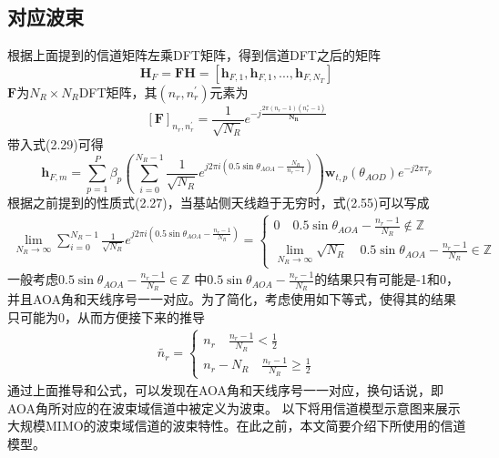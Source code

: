 \documentclass[bachelor,nocolorlinks, printoneside]{seuthesis} %
\begin{document}
\begin{Main}
\subsection{对应波束}
根据上面提到的信道矩阵左乘DFT矩阵，得到信道DFT之后的矩阵
\begin{equation}\label{key}
\mathbf{H}_{F} = \mathbf{F} \mathbf{H} =[\mathbf{h}_{F,1},\mathbf{h}_{F,1},...,\mathbf{h}_{F,N_T}]
\end{equation}
$\mathbf{F}$为$N_R \times N_R $DFT矩阵，其$(n_r,n_r^{'})$元素为
\begin{equation}\label{key}
[ \mathbf{F} ]_{n_r,n_r^{'}} = \frac{1}{\sqrt{N_R}} e^{-j \frac{2\pi (n_r-1)(n_r^{*}-1)}{\mathbf{N_R}}}
\end{equation}
带入式(2.29)可得
\begin{equation}\label{key}
\mathbf{h}_{F,m} = \sum_{p=1}^{P} \beta_p \left( \sum_{i=0}^{N_R-1} \frac{1}{\sqrt{N_R}} e^{j2\pi i(0.5\sin \theta_{AOA} - \frac{N_R}{n_r-1})} \right) \mathbf{w}_{t,p}(\theta_{AOD}) e^{-j2\pi\tau_{p}}
\end{equation}
根据之前提到的性质式(2.27)，当基站侧天线趋于无穷时，式(2.55)可以写成
\begin{eqnarray}\label{key}
\lim_{N_R \rightarrow \infty} \sum_{i=0}^{N_R-1} \frac{1}{\sqrt{N_R}} e^{j2\pi i(0.5 \sin \theta_{AOA} -\frac{n_r-1}{N_R})} = \left \lbrace
\begin{array}{l}
0 \quad 0.5\sin \theta_{AOA} - \frac{n_r-1}{N_R} \notin \mathbb{Z} \\
\lim_{N_R \rightarrow \infty} \sqrt{N_R}  \quad 0.5\sin \theta_{AOA} - \frac{n_r-1}{N_R} \in \mathbb{Z} 
\end{array}
\right.
\end{eqnarray}
一般考虑$ 0.5\sin \theta_{AOA} - \frac{n_r-1}{N_R} \in \mathbb{Z}$ 中$0.5\sin \theta_{AOA} - \frac{n_r-1}{N_R} $的结果只有可能是-1和0，并且AOA角和天线序号一一对应。为了简化，考虑使用如下等式，使得其的结果只可能为0，从而方便接下来的推导
\begin{eqnarray}\label{key}
\tilde{n_r} = \left \lbrace
\begin{array}{l}
n_r \quad \frac{n_r-1}{N_R} < \frac{1}{2}\\
n_r - N_R \quad \frac{n_r-1}{N_R} \geq \frac{1}{2}
\end{array}
\right.
\end{eqnarray}
通过上面推导和公式，可以发现在AOA角和天线序号一一对应，换句话说，即AOA角所对应的在波束域信道中被定义为波束。
以下将用信道模型示意图来展示大规模MIMO的波束域信道的波束特性。在此之前，本文简要介绍下所使用的信道模型。

\end{Main}
\end{document}
